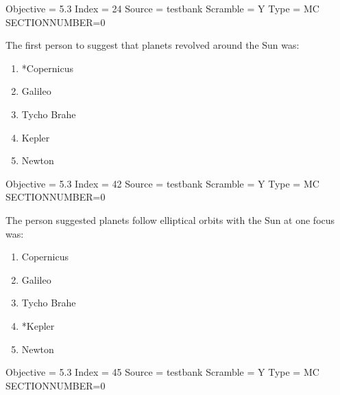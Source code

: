 \documentclass[11pt]{article}
\begin{document}
\begin{enumerate}
\begin{minipage}{\textwidth}
\begin{minipage}{\textwidth}
Objective = 5.3
Index = 24
Source = testbank
Scramble = Y
Type = MC
SECTIONNUMBER=0
\end{minipage}
\end{minipage}
\vskip 0.20in

\begin{minipage}{\textwidth}
\begin{minipage}{\textwidth}
\item The first person to suggest that planets revolved around the Sun was:
\begin{multicols}{3}
\begin{enumerate} 
\setlength{\itemsep}{1pt} 
\setlength{\parskip}{0pt} 
\setlength{\parsep}{0pt}
\setlength{\multicolsep}{1pt} 
\item *Copernicus
\item Galileo
\item Tycho Brahe
\item Kepler
\item Newton
\end{enumerate} 
\vfill 
\end{multicols}

Objective = 5.3
Index = 42
Source = testbank
Scramble = Y
Type = MC
SECTIONNUMBER=0
\end{minipage}
\end{minipage}
\vskip 0.20in

\begin{minipage}{\textwidth}
\begin{minipage}{\textwidth}
\item The person suggested planets follow elliptical orbits with the Sun at one focus was:
\begin{multicols}{3}
\begin{enumerate} 
\setlength{\itemsep}{1pt} 
\setlength{\parskip}{0pt} 
\setlength{\parsep}{0pt}
\setlength{\multicolsep}{1pt} 
\item Copernicus
\item Galileo
\item Tycho Brahe
\item *Kepler
\item Newton
\end{enumerate} 
\vfill 
\end{multicols}

Objective = 5.3
Index = 45
Source = testbank
Scramble = Y
Type = MC
SECTIONNUMBER=0
\end{minipage}
\end{minipage}
\vskip 0.20in


\end{enumerate}
\end{document}
